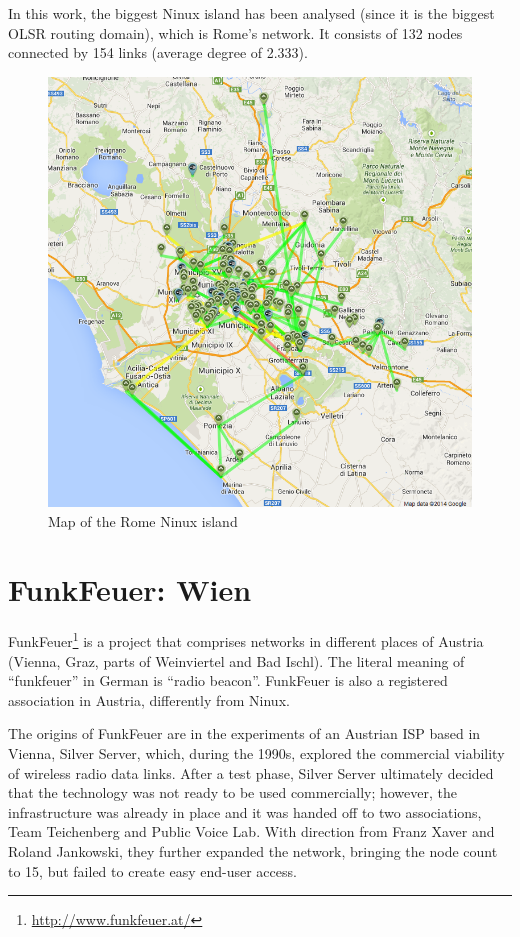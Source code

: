 \documentclass[oneside,openany]{memoir}
\begin{document}
In this work, the biggest Ninux island has been analysed (since it is
the biggest OLSR routing domain), which is Rome's network. It consists
of 132 nodes connected by 154 links (average degree of 2.333).

\begin{figure}[htbp]
\centering
\includegraphics{images/ninux_map.png}
\caption{Map of the Rome Ninux island}
\end{figure}

\section{FunkFeuer: Wien}\label{funkfeuer-wien}

FunkFeuer\footnote{\url{http://www.funkfeuer.at/}} is a project that
comprises networks in different places of Austria (Vienna, Graz, parts of
Weinviertel and Bad Ischl). The literal meaning of ``funkfeuer'' in
German is ``radio beacon''. FunkFeuer is also a registered association
in Austria, differently from Ninux.

The origins of FunkFeuer are in the experiments of an Austrian ISP based
in Vienna, Silver Server, which, during the 1990s, explored the
commercial viability of wireless radio data links. After a test phase,
Silver Server ultimately decided that the technology was not ready to be
used commercially; however, the infrastructure was already in place and
it was handed off to two associations, Team Teichenberg and Public Voice
Lab. With direction from Franz Xaver and Roland Jankowski, they further
expanded the network, bringing the node count to 15, but failed to
create easy end-user access.
\end{document}
